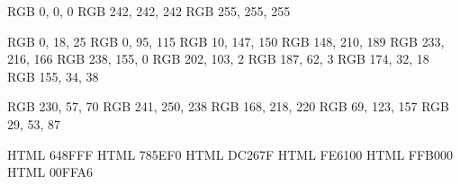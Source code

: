 

\definecolor{BaseBlack}       {RGB}  {  0,   0,   0}
\definecolor{BaseGrey}        {RGB}  {242, 242, 242}
\definecolor{BaseWhite}       {RGB}  {255, 255, 255}


\definecolor{RichBlackFOGRA}  {RGB}  {  0,  18,  25}
\definecolor{BlueSapphire}    {RGB}  {  0,  95, 115}
\definecolor{ViridianGreen}   {RGB}  { 10, 147, 150}
\definecolor{MiddleBlueGreen} {RGB}  {148, 210, 189}
\definecolor{MediumChampagne} {RGB}  {233, 216, 166}
\definecolor{Gamboge}         {RGB}  {238, 155,   0}
\definecolor{AlloyOrange}     {RGB}  {202, 103,   2}
\definecolor{Mahogany}        {RGB}  {187,  62,   3}
\definecolor{Rufous}          {RGB}  {174,  32,  18}
\definecolor{RubyRed}         {RGB}  {155,  34,  38}


\definecolor{ImperialRed}     {RGB}  {230,  57,  70}
\definecolor{Honeydew}        {RGB}  {241, 250, 238}
\definecolor{PowderBlue}      {RGB}  {168, 218, 220}
\definecolor{CeladonBlue}     {RGB}  { 69, 123, 157}
\definecolor{PrussianBlue}    {RGB}  { 29,  53,  87}


\definecolor{CornflowerBlue}  {HTML} {648FFF}
\definecolor{MediumSlateBlue} {HTML} {785EF0}
\definecolor{MexicanPink}     {HTML} {DC267F}
\definecolor{OrangePantone}   {HTML} {FE6100}
\definecolor{SelectiveYellow} {HTML} {FFB000}
\definecolor{Aquamarine}      {HTML} {00FFA6}
